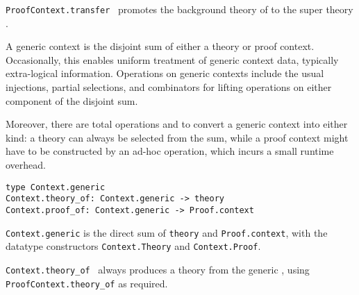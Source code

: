 \begin{isabellebody}
\begin{isamarkuptext}
\begin{description}
  \item \verb|ProofContext.transfer|~ promotes the
  background theory of  to the super theory .

  \end{description}%
\end{isamarkuptext}%
\isamarkuptrue%
%
\endisatagmlref
{\isafoldmlref}%
%
\isadelimmlref
%
\endisadelimmlref
%
\isamarkuptrue%
%
\begin{isamarkuptext}%
A generic context is the disjoint sum of either a theory or proof
  context.  Occasionally, this enables uniform treatment of generic
  context data, typically extra-logical information.  Operations on
  generic contexts include the usual injections, partial selections,
  and combinators for lifting operations on either component of the
  disjoint sum.

  Moreover, there are total operations  and  to convert a generic context into either kind: a theory
  can always be selected from the sum, while a proof context might
  have to be constructed by an ad-hoc  operation, which
  incurs a small runtime overhead.%
\end{isamarkuptext}%
\isamarkuptrue%
%
\isadelimmlref
%
\endisadelimmlref
%
\isatagmlref
%
\begin{isamarkuptext}%
\begin{mldecls}
  \verb|type Context.generic| \\
  \verb|Context.theory_of: Context.generic -> theory| \\
  \verb|Context.proof_of: Context.generic -> Proof.context| \\
  \end{mldecls}

  \begin{description}

  \item \verb|Context.generic| is the direct sum of \verb|theory| and \verb|Proof.context|, with the datatype
  constructors \verb|Context.Theory| and \verb|Context.Proof|.

  \item \verb|Context.theory_of|~ always produces a
  theory from the generic , using \verb|ProofContext.theory_of| as required.


\end{description}
\end{isamarkuptext}
\end{isabellebody}

